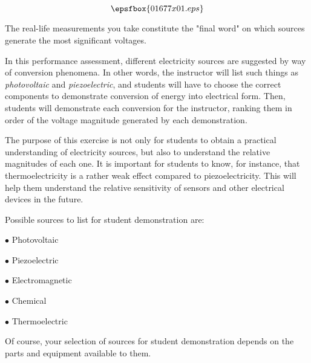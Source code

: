 

$$\epsfbox{01677x01.eps}$$

\vfil \eject






The real-life measurements you take constitute the "final word" on which sources generate the most significant voltages.







In this performance assessment, different electricity sources are suggested by way of conversion phenomena.  In other words, the instructor will list such things as {\it photovoltaic} and {\it piezoelectric}, and students will have to choose the correct components to demonstrate conversion of energy into electrical form.  Then, students will demonstrate each conversion for the instructor, ranking them in order of the voltage magnitude generated by each demonstration.

The purpose of this exercise is not only for students to obtain a practical understanding of electricity sources, but also to understand the relative magnitudes of each one.  It is important for students to know, for instance, that thermoelectricity is a rather weak effect compared to piezoelectricity.  This will help them understand the relative sensitivity of sensors and other electrical devices in the future.

Possible sources to list for student demonstration are:

\medskip
\item{$\bullet$} Photovoltaic
\item{$\bullet$} Piezoelectric
\item{$\bullet$} Electromagnetic
\item{$\bullet$} Chemical
\item{$\bullet$} Thermoelectric
\medskip

Of course, your selection of sources for student demonstration depends on the parts and equipment available to them.




